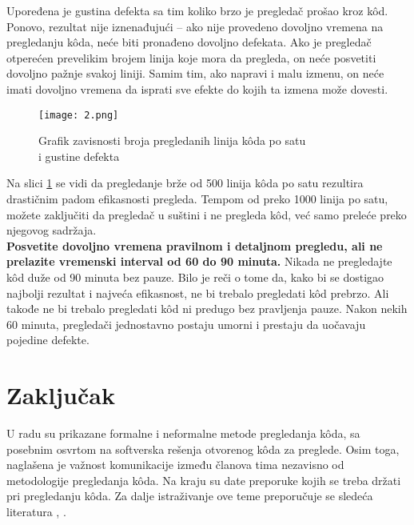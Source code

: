 \documentclass[a4paper]{article}
\begin{document}
Upoređena je gustina defekta sa tim koliko brzo je pregledač prošao kroz kôd. Ponovo, rezultat nije iznenađujući -- ako nije provedeno dovoljno vremena na pregledanju kôda, neće biti pronađeno dovoljno defekata. Ako je pregledač otperećen prevelikim brojem linija koje mora da pregleda, on neće posvetiti dovoljno pažnje svakoj liniji. Samim tim, ako napravi i malu izmenu, on neće imati dovoljno vremena da isprati sve efekte do kojih ta izmena može dovesti.

\begin{figure}[ht]
\begin{center}
\texttt{[image: 2.png]}
\end{center}
\caption{Grafik zavisnosti broja pregledanih linija kôda po satu \\ i gustine defekta}
\label{fig:vreme}
\end{figure}
Na slici \ref{fig:vreme} se vidi da pregledanje brže od 500 linija kôda po satu rezultira drastičnim padom efikasnosti pregleda. Tempom od preko 1000 linija po satu, možete zaključiti da pregledač u suštini i ne pregleda kôd, već samo preleće preko njegovog sadržaja. \\ 

\textbf{Posvetite dovoljno vremena pravilnom i detaljnom pregledu, ali ne prelazite vremenski interval od 60 do 90 minuta.} Nikada ne pregledajte kôd duže od 90 minuta bez pauze. Bilo je reči o tome da, kako bi se dostigao najbolji rezultat i najveća efikasnost, ne bi trebalo pregledati kôd prebrzo. Ali takođe ne bi trebalo pregledati kôd ni predugo bez pravljenja pauze. Nakon nekih 60 minuta, pregledači jednostavno postaju umorni i prestaju da uočavaju pojedine defekte.


\section{Zaključak}
U radu su prikazane formalne i neformalne metode pregledanja kôda, sa posebnim osvrtom na softverska rešenja otvorenog kôda za preglede. Osim toga, naglašena je važnost komunikacije između članova tima nezavisno od metodologije pregledanja kôda. Na kraju su date preporuke kojih se treba držati pri pregledanju kôda. Za dalje istraživanje ove teme preporučuje se sledeća literatura \cite{bkspcr}, \cite{gee}.


{}
\appendix

 

\appendix
\end{document}

